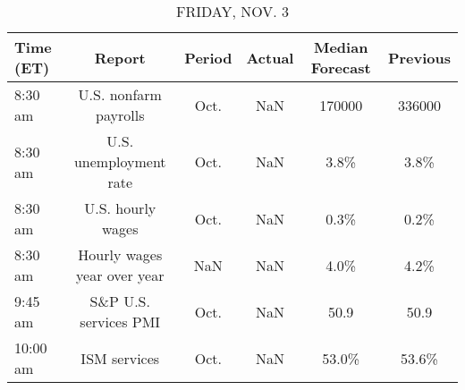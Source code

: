 \documentclass{article}%
\begin{document}
%


\begin{table}[htbp]%
\caption{FRIDAY, NOV. 3}%
\centering%
\begin{adjustbox}{width=1\textwidth}%
\begin{tabular}{lccccc}
\toprule
Time (ET) &                      Report & Period & Actual & Median Forecast & Previous \\
\midrule
  8:30 am &       U.S. nonfarm payrolls &   Oct. &    NaN &          170000 &   336000 \\
  8:30 am &      U.S. unemployment rate &   Oct. &    NaN &            3.8\% &     3.8\% \\
  8:30 am &           U.S. hourly wages &   Oct. &    NaN &            0.3\% &     0.2\% \\
  8:30 am & Hourly wages year over year &    NaN &    NaN &            4.0\% &     4.2\% \\
  9:45 am &       S\&P U.S. services PMI &   Oct. &    NaN &            50.9 &     50.9 \\
 10:00 am &                ISM services &   Oct. &    NaN &           53.0\% &    53.6\% \\
\bottomrule
\end{tabular}
%
\end{adjustbox}%
\end{table}
\end{document}

